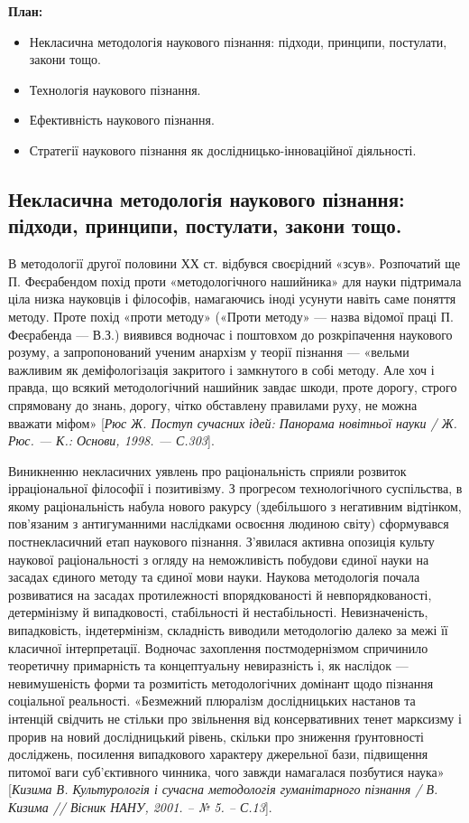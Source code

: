 \textbf{План:}
\begin{itemize}
	\item Некласична методологія наукового пізнання: підходи, принципи, постулати,
	закони тощо.
	
	\item Технологія наукового пізнання.

	\item Ефективність наукового пізнання.

	\item Стратегії наукового пізнання як дослідницько-інноваційної діяльності.
\end{itemize}

\subsection[Некласична методологія наукового пізнання]{Некласична методологія наукового пізнання: підходи, при\-нципи, постулати, закони тощо.}
В методології другої половини ХХ ст. відбувся
своєрідний «зсув». Розпочатий ще П. Феєрабендом похід проти
«методологічного нашийника» для науки підтримала ціла низка науковців і
філософів, намагаючись іноді усунути навіть саме поняття методу. Проте похід
«проти методу» («Проти методу» --- назва відомої праці П. Феєрабенда --- В.З.)
виявився водночас і поштовхом до розкріпачення наукового розуму, а
запропонований ученим анархізм у теорії пізнання --- «вельми важливим як
деміфологізація закритого і замкнутого в собі методу. Але хоч і правда, що
всякий методологічний нашийник завдає шкоди, проте дорогу, строго
спрямовану до знань, дорогу, чітко обставлену правилами руху, не можна
вважати міфом» [\textit{Рюс Ж. Поступ сучасних ідей: Панорама новітньої науки / Ж.
Рюс. --- К.: Основи, 1998. --- С.303}].

Виникненню некласичних уявлень про раціональність сприяли розвиток
ірраціональної філософії і позитивізму. З прогресом технологічного
суспільства, в якому раціональність набула нового ракурсу (здебільшого з
негативним відтінком, пов’язаним з антигуманними наслідками освоєння
людиною світу) сформувався постнекласичний етап наукового пізнання.
З’явилася активна опозиція культу наукової раціональності з огляду на
неможливість побудови єдиної науки на засадах єдиного методу та єдиної мови
науки. Наукова методологія почала розвиватися на засадах протилежності
впорядкованості й невпорядкованості, детермінізму й випадковості,
стабільності й нестабільності. Невизначеність, випадковість, індетермінізм,
складність виводили методологію далеко за межі її класичної інтерпретації.
Водночас захоплення постмодернізмом спричинило теоретичну примарність та
концептуальну невиразність і, як наслідок --- невимушеність форми та
розмитість методологічних домінант щодо пізнання соціальної реальності.
«Безмежний плюралізм дослідницьких настанов та інтенцій свідчить не стільки
про звільнення від консервативних тенет марксизму і прорив на новий
дослідницький рівень, скільки про зниження ґрунтовності досліджень,
посилення випадкового характеру джерельної бази, підвищення питомої ваги
суб’єктивного чинника, чого завжди намагалася позбутися наука» [\textit{Кизима В.
Культурологія і сучасна методологія гуманітарного пізнання / В. Кизима //
Вісник НАНУ, 2001. – № 5. – С.13}].

